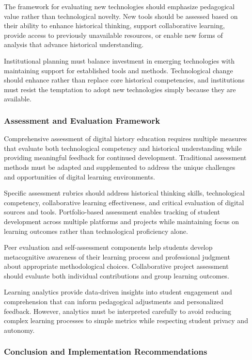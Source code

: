 The framework for evaluating new technologies should emphasize pedagogical value rather than technological novelty. New tools should be assessed based on their ability to enhance historical thinking, support collaborative learning, provide access to previously unavailable resources, or enable new forms of analysis that advance historical understanding.

Institutional planning must balance investment in emerging technologies with maintaining support for established tools and methods. Technological change should enhance rather than replace core historical competencies, and institutions must resist the temptation to adopt new technologies simply because they are available.

\subsubsection {Assessment and Evaluation Framework}

Comprehensive assessment of digital history education requires multiple measures that evaluate both technological competency and historical understanding while providing meaningful feedback for continued development. Traditional assessment methods must be adapted and supplemented to address the unique challenges and opportunities of digital learning environments.

Specific assessment rubrics should address historical thinking skills, technological competency, collaborative learning effectiveness, and critical evaluation of digital sources and tools. Portfolio-based assessment enables tracking of student development across multiple platforms and projects while maintaining focus on learning outcomes rather than technological proficiency alone.

Peer evaluation and self-assessment components help students develop metacognitive awareness of their learning process and professional judgment about appropriate methodological choices. Collaborative project assessment should evaluate both individual contributions and group learning outcomes.

Learning analytics provide data-driven insights into student engagement and comprehension that can inform pedagogical adjustments and personalized feedback. However, analytics must be interpreted carefully to avoid reducing complex learning processes to simple metrics while respecting student privacy and autonomy.

\subsubsection {Conclusion and Implementation Recommendations}

